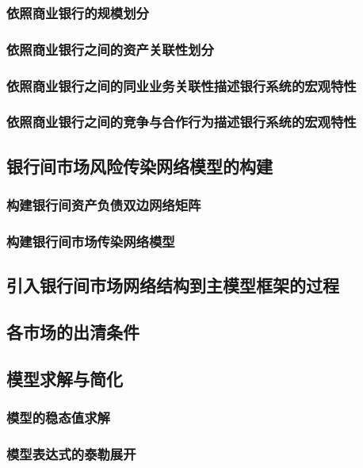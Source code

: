 \subsubsection{依照商业银行的规模划分}
\subsubsection{依照商业银行之间的资产关联性划分}
\subsubsection{依照商业银行之间的同业业务关联性描述银行系统的宏观特性}
\subsubsection{依照商业银行之间的竞争与合作行为描述银行系统的宏观特性}

\newpage
\subsection{银行间市场风险传染网络模型的构建}

\subsubsection{构建银行间资产负债双边网络矩阵}
\subsubsection{构建银行间市场传染网络模型}

\newpage
\subsection{引入银行间市场网络结构到主模型框架的过程}

\newpage
\subsection{各市场的出清条件}

\newpage
\subsection{模型求解与简化}

\subsubsection{模型的稳态值求解}
\subsubsection{模型表达式的泰勒展开}

